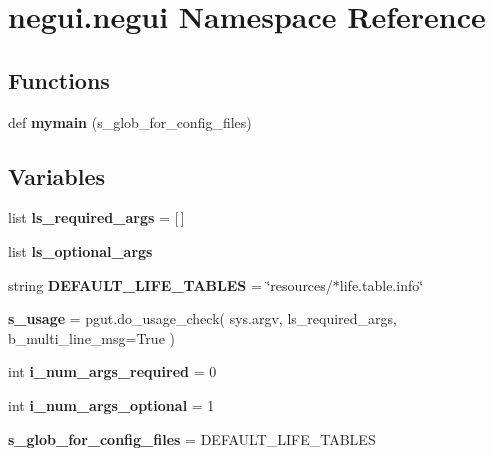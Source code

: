 \hypertarget{namespacenegui_1_1negui}{}\section{negui.\+negui Namespace Reference}
\label{namespacenegui_1_1negui}
\subsection*{Functions}
\begin{DoxyCompactItemize}
\item 
def {\bfseries mymain} (s\+\_\+glob\+\_\+for\+\_\+config\+\_\+files)\hypertarget{namespacenegui_1_1negui_adde18293ea6580b90d1f6c1818ae6ba2}{}\label{namespacenegui_1_1negui_adde18293ea6580b90d1f6c1818ae6ba2}

\end{DoxyCompactItemize}
\subsection*{Variables}
\begin{DoxyCompactItemize}
\item 
list {\bfseries ls\+\_\+required\+\_\+args} = \mbox{[}$\,$\mbox{]}\hypertarget{namespacenegui_1_1negui_a9eeadfc32f46a35f477004db8dfa230d}{}\label{namespacenegui_1_1negui_a9eeadfc32f46a35f477004db8dfa230d}

\item 
list {\bfseries ls\+\_\+optional\+\_\+args}
\item 
string {\bfseries D\+E\+F\+A\+U\+L\+T\+\_\+\+L\+I\+F\+E\+\_\+\+T\+A\+B\+L\+ES} = \char`\"{}resources/$\ast$life.\+table.\+info\char`\"{}\hypertarget{namespacenegui_1_1negui_adb4e603433342d5dfc482202bc863e62}{}\label{namespacenegui_1_1negui_adb4e603433342d5dfc482202bc863e62}

\item 
{\bfseries s\+\_\+usage} = pgut.\+do\+\_\+usage\+\_\+check( sys.\+argv, ls\+\_\+required\+\_\+args, b\+\_\+multi\+\_\+line\+\_\+msg=True )\hypertarget{namespacenegui_1_1negui_a3655412177f9ff140033a529e87bcf06}{}\label{namespacenegui_1_1negui_a3655412177f9ff140033a529e87bcf06}

\item 
int {\bfseries i\+\_\+num\+\_\+args\+\_\+required} = 0\hypertarget{namespacenegui_1_1negui_a5e6d18b2d552f77bcd0627b60f3a1c6c}{}\label{namespacenegui_1_1negui_a5e6d18b2d552f77bcd0627b60f3a1c6c}

\item 
int {\bfseries i\+\_\+num\+\_\+args\+\_\+optional} = 1\hypertarget{namespacenegui_1_1negui_a62ef721289489002a2d1c1b694beedae}{}\label{namespacenegui_1_1negui_a62ef721289489002a2d1c1b694beedae}

\item 
{\bfseries s\+\_\+glob\+\_\+for\+\_\+config\+\_\+files} = D\+E\+F\+A\+U\+L\+T\+\_\+\+L\+I\+F\+E\+\_\+\+T\+A\+B\+L\+ES\hypertarget{namespacenegui_1_1negui_a375e271f4f4aa817eecda856d62b23b1}{}\label{namespacenegui_1_1negui_a375e271f4f4aa817eecda856d62b23b1}

\end{DoxyCompactItemize}


